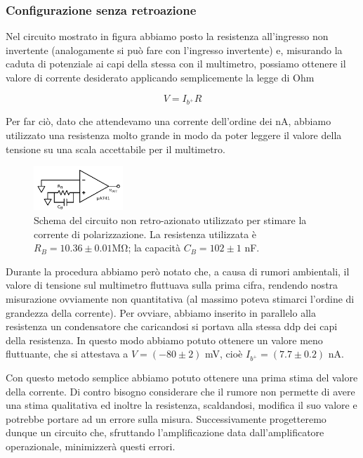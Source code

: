 \subsubsection{Configurazione senza retroazione}

Nel circuito mostrato in figura abbiamo posto la resistenza all'ingresso non invertente (analogamente si può fare con l'ingresso invertente) e, misurando la caduta di potenziale ai capi della stessa con il multimetro, possiamo ottenere il valore di corrente desiderato applicando semplicemente la legge di Ohm

$$V=I_{b^+} R$$

Per far ciò, dato che attendevamo una corrente dell'ordine dei \si{\nano\ampere}, abbiamo utilizzato una resistenza molto grande in modo da poter leggere il valore della tensione su una scala accettabile per il multimetro.

\begin{figure}
  \begin{center}
    \includegraphics[width=0.30\textwidth]{../E02/latex/direct_measure.pdf}
  \end{center}
  \caption{Schema del circuito non retro-azionato utilizzato per stimare la corrente di polarizzazione. La resistenza utilizzata è $R_B=10.36\pm0.01$\si{\mega\ohm}; la capacità $C_B=102 \pm 1$ \si{\nano\farad}.}
  \label{circuito:rel2_correnti_senzaretroazione}
\end{figure}

Durante la procedura abbiamo però notato che, a causa di rumori ambientali, il valore di tensione sul multimetro fluttuava sulla prima cifra, rendendo nostra misurazione ovviamente non quantitativa (al massimo poteva stimarci l'ordine di grandezza della corrente). Per ovviare, abbiamo inserito in parallelo alla resistenza un condensatore che caricandosi si portava alla stessa ddp dei capi della resistenza. In questo modo abbiamo potuto ottenere un valore meno fluttuante, che si attestava a $V=(-80 \pm 2)$ \si{\milli\volt}, cioè $I_{b^+}=(7.7 \pm 0.2)$ \si{\nano\ampere}.

Con questo metodo semplice abbiamo potuto ottenere una prima stima del valore della corrente. Di contro bisogno considerare che il rumore non permette di avere una stima qualitativa ed inoltre la resistenza, scaldandosi, modifica il suo valore e potrebbe portare ad un errore sulla misura. Successivamente progetteremo dunque un circuito che, sfruttando l'amplificazione data dall'amplificatore operazionale, minimizzerà questi errori.

